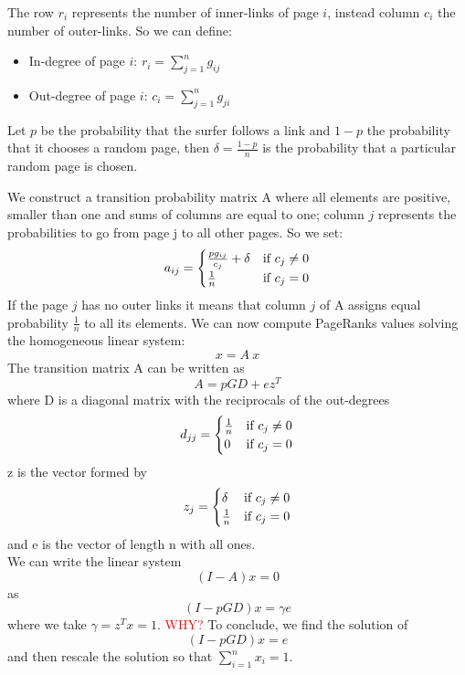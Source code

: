 \documentclass[]{usiinfbachelorproject}
\newcommand\tab[1][1cm]{\hspace*{#1}}
\begin{document}
The row $r_i$ represents the number of inner-links of page $i$, instead column $c_i$ the number of outer-links. So we can define:
\begin{itemize}
\item In-degree of page $i$: \tab $r_i = \sum\limits_{j=1}^{n} g_{ij}$
\item Out-degree of page $i$: \tab $c_i = \sum\limits_{j=1}^{n} g_{ji}$
\end{itemize}
Let $p$ be the probability that the surfer follows a link and $1-p$ the probability that it chooses a random page, then $\delta = \frac{1-p}{n}$ is the probability that a particular random page is chosen.

We construct a transition probability matrix A where all elements are positive, smaller than one and sums of columns are equal to one; column $j$ represents the probabilities to go from page j to all other pages. So we set:
\begin{equation}\notag
a_{ij} = 
\begin{cases}
\frac{pg_{ij}}{c_{j}} + \delta  & \text{if } c_{j} \neq 0\\
\frac{1}{n} & \text{if } c_{j} = 0
\end{cases}
\end{equation}
If the page $j$ has no outer links it means that column $j$ of A assigns equal probability $\frac{1}{n}$ to all its elements. We can now compute PageRanks values solving the homogeneous linear system:
$$x = A\:x$$
The transition matrix A can be written as
$$A = pGD+ez^{T}$$
where D is a diagonal matrix with the reciprocals of the out-degrees
\begin{equation}\notag
d_{jj} = 
\begin{cases}
\frac{1}{n} & \text{if } c_{j} \neq 0\\
0 & \text{if } c_{j} = 0
\end{cases}
\end{equation}
z is the vector formed by
\begin{equation}\notag
z_{j} = 
\begin{cases}
\delta & \text{if } c_{j} \neq 0\\
\frac{1}{n} & \text{if } c_{j} = 0
\end{cases}
\end{equation}
and e is the vector of length n with all ones.\\
We can write the linear system
$$(I-A)x=0$$
as
$$(I - pGD)x = \gamma e$$
where we take $\gamma = z^{T} x=1$. \textcolor{red}{WHY?}
To conclude, we find the solution of
$$(I - pGD)x = e$$
and then rescale the solution so that $\sum\limits_{i=1}^{n} x_i = 1$.
\end{document}
